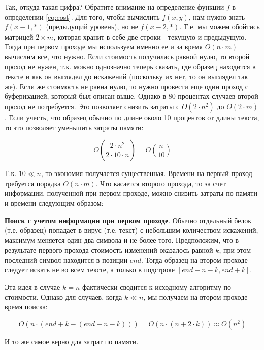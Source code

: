 \documentclass[11pt,a4paper,oneside]{article}
\begin{document}
Так, откуда такая цифра? Обратите внимание на определение функции $f$ в определении \ref{eq:cost}. Для того, чтобы вычислить $f(x,y)$, нам нужно знать $f(x-1,\ast)$ (предыдущий уровень), но не $f(x-2,\ast)$. Т.е. мы можем обойтись матрицей $2\times m$, которая хранит в себе две строки - текущую и предыдущую. Тогда при первом проходе мы используем именно ее и за время $O(n\cdot m)$ вычислим все, что нужно. Если стоимость получилась равной нулю, то второй проход не нужен, т.к. можно однозначно теперь сказать, где образец находится в тексте и как он выглядел до искажений (поскольку их нет, то он выглядел так же). Если же стоимость не равна нулю, то нужно провести еще один проход с буферизацией, который был описан выше. Однако в 80 процентах случаев второй проход не потребуется. Это позволяет снизить затраты с $O(2\cdot n^2)$ до $O(2\cdot m)$. Если учесть, что образец обычно по длине около 10 процентов от длины текста, то это позволяет уменьшить затраты памяти:

\begin{equation}
	O(\frac{2\cdot n^2}{2\cdot 10\cdot n}) = O(\frac{n}{10})
\end{equation}

Т.к. $10\ll n$, то экономия получается существенная. Времени на первый проход требуется порядка $O(n\cdot m)$. Что касается второго прохода, то за счет информации, полученной при первом проходе, можно снизить затраты по памяти и времени следующим образом:

\begin{heuristic}
\textbf{Поиск с учетом информации при первом проходе}. Обычно отдельный белок (т.е. образец) попадает в вирус (т.е. текст) с небольшим количеством искажений, максимум меняется один-два символа и не более того. Предположим, что в результате первого прохода стоимость изменений оказалось равной $k$, при этом последний символ находится в позиции $end$. Тогда образец на втором проходе следует искать не во всем тексте, а только в подстроке $[end-n-k,end+k]$. 
\end{heuristic}

Эта идея в случае $k=n$ фактически сводится к исходному алгоритму по стоимости. Однако для случаев, когда $k\ll n$, мы получаем на втором проходе время поиска:

\begin{equation}
	O(n\cdot (end+k - (end-n-k))) = O(n\cdot(n+2\cdot k)) \approx  O(n^2)
\end{equation}

И то же самое верно для затрат по памяти.
\end{document}
